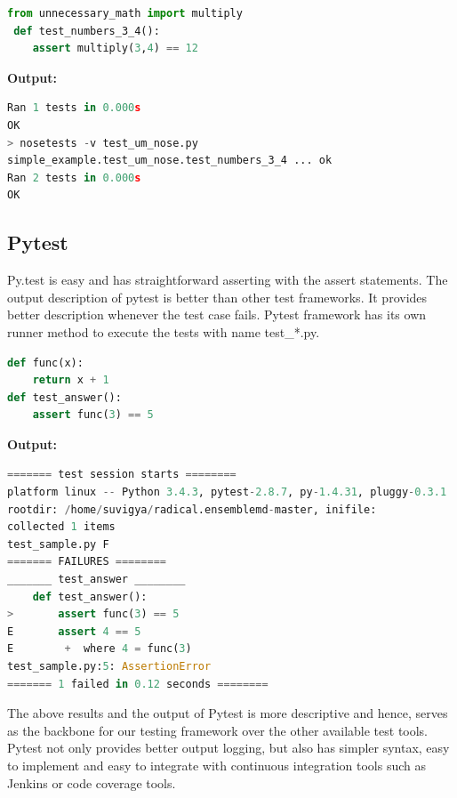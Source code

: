\documentclass[10pt]{ruthesis}
\begin{document}
\begin{lstlisting}[language=Python]
from unnecessary_math import multiply
 def test_numbers_3_4():
    assert multiply(3,4) == 12 
\end{lstlisting}
\textbf{Output:}
\begin{lstlisting}[language=Python]
Ran 1 tests in 0.000s
OK
> nosetests -v test_um_nose.py
simple_example.test_um_nose.test_numbers_3_4 ... ok
Ran 2 tests in 0.000s
OK
\end{lstlisting}

\subsection{Pytest}
Py.test is easy and has straightforward asserting with the assert statements. The output description of pytest is better than other test frameworks. It provides better description whenever the test case fails. Pytest framework has its own runner method to execute the tests with name test\_*.py.

\begin{lstlisting}[language=Python]
def func(x):
    return x + 1
def test_answer():
    assert func(3) == 5
\end{lstlisting}

\textbf{Output:}

\begin{lstlisting}[language=Python]
======= test session starts ========
platform linux -- Python 3.4.3, pytest-2.8.7, py-1.4.31, pluggy-0.3.1
rootdir: /home/suvigya/radical.ensemblemd-master, inifile:
collected 1 items
test_sample.py F
======= FAILURES ========
_______ test_answer ________
    def test_answer():
>       assert func(3) == 5
E       assert 4 == 5
E        +  where 4 = func(3)
test_sample.py:5: AssertionError
======= 1 failed in 0.12 seconds ========
\end{lstlisting}

The above results and the output of Pytest is more descriptive and hence, serves as the backbone for our testing framework over the other available test tools. Pytest not only provides better output logging, but also has simpler syntax, easy to implement and easy to integrate with continuous integration tools such as Jenkins or code coverage tools.
\end{document}
